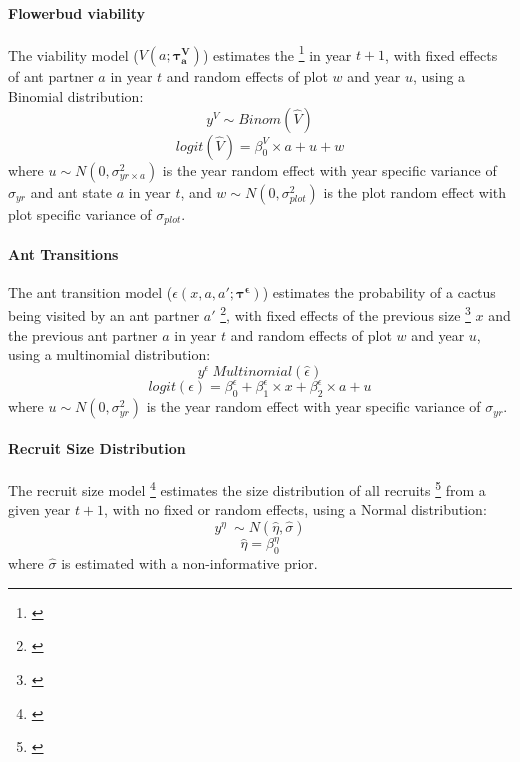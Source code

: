 \documentclass[11pt]{article}
\newcommand{\tom}[2]{{\color{red}{#1}}\footnote{\textit{\color{red}{#2}}}}
\begin{document}
\paragraph{Flowerbud viability}
The viability model ($V(a;\pmb{\tau^{V}_{a}})$) estimates the \tom{proportion of flowers produced by a plant which are viable (not aborted) $y^V$}{$y^V$ is not the proportion of viable buds.} in year $t+1$, with fixed effects of ant partner $a$ in year $t$ and random effects of plot $w$ and year $u$, using a Binomial distribution:
$$y^{V} \sim Binom(\hat{V})$$
$$logit(\hat{V}) = \beta_{0}^{V} \times a + u + w$$
where $u \sim N(0,\sigma_{yr \times a}^{2})$ is the year random effect with year specific variance of $\sigma_{yr}$ and ant state $a$ in year $t$, and $w \sim N(0,\sigma_{plot}^{2})$ is the plot random effect with plot specific variance of $\sigma_{plot}$.

\paragraph{Ant Transitions}
The ant transition model ($\epsilon(x,a,a';\pmb{\tau^{\epsilon}})$) estimates the probability of a cactus being visited by an ant partner $a'$ \tom{$y^{\epsilon}$}{This is not the probability of being visited.}, with fixed effects of the previous size \tom{of the cholla}{I will not make this comment everywhere but notice that ``of the cholla'' does basically no work in this sentence. It is very clear to readers at this point that ``size'' refers to size of the cholla, so these words can be cut. More generally, edit your own writing to remove words (or sentences) like this that take up space but provide no new information.} $x$  and the previous ant partner $a$  in year $t$ and random effects of plot $w$ and year $u$, using a multinomial distribution: 
$$y^{\epsilon} ~ Multinomial(\hat{\epsilon})$$
$$logit(\epsilon) = \beta_{0}^{\epsilon} + \beta_{1}^{\epsilon} \times x + \beta_{2}^{\epsilon} \times a + u$$
where $u \sim N(0,\sigma_{yr}^{2})$ is the year random effect with year specific variance of $\sigma_{yr}$.

\paragraph{Recruit Size Distribution}
The recruit size model \tom{($n(x,a')$)}{Not the correct notation.} estimates the size distribution of all recruits \tom{$y^{\eta}$}{Think deeply about what the $y$'s represent and how you can better describe them.} from a given year $t+1$, with no fixed or random effects, using a Normal distribution: 
$$y^{\eta} ~\sim N(\hat{\eta},\hat{\sigma})$$
$$\hat{\eta} = \beta_{0}^{\eta}$$
where $\hat{\sigma}$ is estimated with a non-informative prior. 
\end{document}
